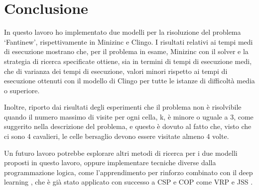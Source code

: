 \documentclass[12pt]{article}
\begin{document}
\section{Conclusione}
In questo lavoro ho implementato due modelli per la risoluzione del problema ‘Fantinew’, rispettivamente in Minizinc e Clingo. 
I risultati relativi ai tempi medi di esecuzione mostrano che, per il problema in esame, Minizinc con il solver e la strategia di ricerca specificate ottiene, sia in termini di tempi di esecuzione medi, che di varianza dei tempi di esecuzione, valori 
minori rispetto ai tempi di esecuzione ottenuti con il modello di Clingo per tutte le istanze di difficoltà media o superiore.

Inoltre, riporto dai risultati degli esperimenti che il problema non è risolvibile quando il numero massimo di visite per ogni cella, k, è minore o uguale a 3, come suggerito nella descrizione del problema, e questo 
è dovuto al fatto che, visto che ci sono 4 cavalieri, le celle bersaglio devono essere visitate almeno 4 volte.

Un futuro lavoro potrebbe esplorare altri metodi di ricerca per i due modelli proposti in questo lavoro, oppure implementare tecniche diverse dalla programmazione logica, come l'apprendimento per rinforzo combinato con il deep learning \cite{cit:rl}, 
che è già stato applicato con successo a CSP e COP come VRP e JSS \cite{cit:rl_rec}.




\end{document}
